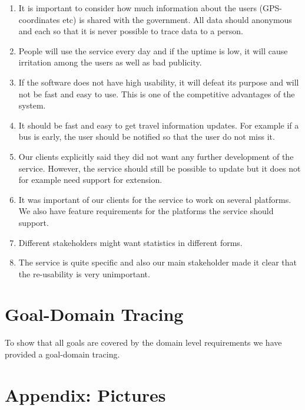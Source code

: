 \documentclass[a4paper]{article}
\begin{document}
		\begin{enumerate}
  			\item It is important to consider how much information about the users (GPS-coordinates etc) is shared with the government.	All data should anonymous and each so that it is never possible to trace data to a person.
  			\item People will use the service every day and if the uptime is low, it will cause irritation among the users as well as bad publicity.
  			\item If the software does not have high usability, it will defeat its purpose and will not be fast and easy to use. This is one of the competitive advantages of the system.
  			\item It should be fast and easy to get travel information updates. For example if a bus is early, the user should be notified so that the user do not miss it.
  			\item Our clients explicitly said they did not want any further development of the service. However, the service should still be possible to update but it does not for example need support for extension.
  			\item It was important of our clients for the service to work on several platforms. We also have feature requirements for the platforms the service should support.
  			\item Different stakeholders might want statistics in different forms.
  			\item The service is quite specific and also our main stakeholder made it clear that the re-usability is very unimportant.	
		\end{enumerate}

	
	\section{Goal-Domain Tracing}
	 To show that all goals are covered by the domain level requirements we have provided a goal-domain tracing. \\
				
		
	\section{Appendix: Pictures} %
		\label{sec:appendix}
		
\end{document}
